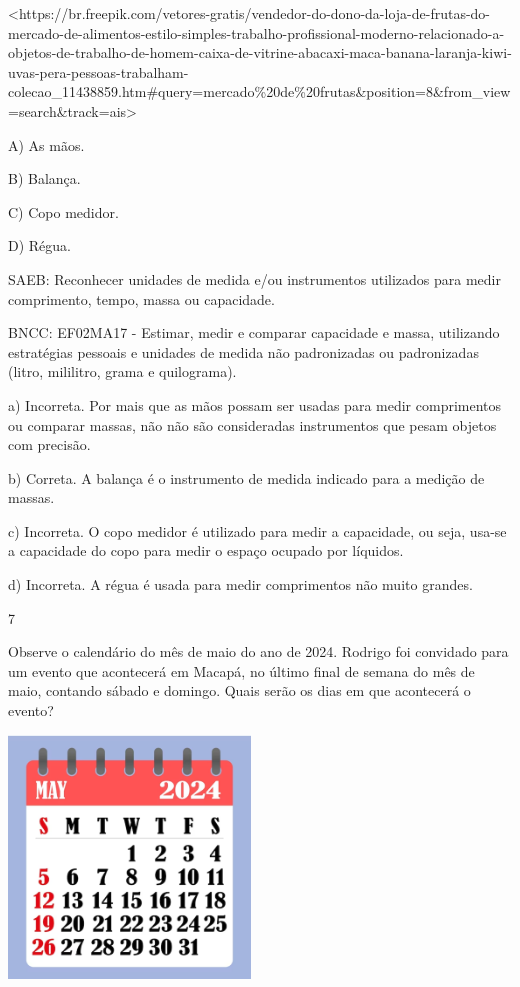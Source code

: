 \begin{escolha}
\begin{escolha}
{{{{{{{{\textless{}https://br.freepik.com/vetores-gratis/vendedor-do-dono-da-loja-de-frutas-do-mercado-de-alimentos-estilo-simples-trabalho-profissional-moderno-relacionado-a-objetos-de-trabalho-de-homem-caixa-de-vitrine-abacaxi-maca-banana-laranja-kiwi-uvas-pera-pessoas-trabalham-colecao\_11438859.htm\#query=mercado\%20de\%20frutas\&position=8\&from\_view=search\&track=ais\textgreater{}

A) As mãos.

B) Balança.

C) Copo medidor.

D) Régua.

SAEB: Reconhecer unidades de medida e/ou instrumentos utilizados
para medir comprimento, tempo, massa ou capacidade.

BNCC: EF02MA17 - Estimar, medir e comparar capacidade
e massa, utilizando estratégias pessoais e unidades de medida não
padronizadas ou padronizadas (litro, mililitro, grama e quilograma).

a) Incorreta. Por mais que as mãos possam ser usadas para medir
comprimentos ou comparar massas, não não são consideradas instrumentos que
pesam objetos com precisão.

b) Correta. A balança é o instrumento de medida indicado para a medição de massas.

c) Incorreta. O copo medidor é utilizado para medir a capacidade, ou
seja, usa-se a capacidade do copo para medir o espaço ocupado por líquidos.

d) Incorreta. A régua é usada para medir comprimentos não muito grandes.

\num{7}

Observe o calendário do mês de maio do ano de 2024. Rodrigo foi
convidado para um evento que acontecerá em Macapá, no último final de
semana do mês de maio, contando sábado e domingo. Quais serão os dias em que acontecerá o evento?

\includegraphics[width=2.53108in,height=2.54167in]{media/image167.png}

}}}}}}}}
\end{escolha}
\end{escolha}
